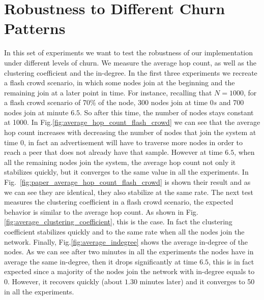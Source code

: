 \section{Robustness to Different Churn Patterns}
\label{sec:robustness}
In this set of experiments we want to test the robustness of our implementation under different levels of churn. We measure the average hop count, as well as the clustering coefficient and the in-degree. In the first three experiments we recreate a flash crowd scenario, in which some nodes join at the beginning and the remaining join at a later point in time. For instance, recalling that $N = 1000$, for a flash crowd scenario of 70\% of the node, 300 nodes join at time $0s$ and 700 nodes join at minute $6.5$. So after this time, the number of nodes stays constant at 1000. In Fig.\ref{fig:average_hop_count_flash_crowd} we can see that the average hop count increases with decreasing the number of nodes that join the system at time 0, in fact an advertisement will have to traverse more nodes in order to reach a peer that does not already have that sample. However at time $6.5$, when all the remaining nodes join the system, the average hop count not only it stabilizes quickly, but it converges to the same value in all the experiments. In Fig.~\ref{fig:paper_average_hop_count_flash_crowd} is shown their result and as we can see they are identical, they also stabilize at the same rate. The next test measures the clustering coefficient in a flash crowd scenario, the expected behavior is similar to the average hop count. As shown in Fig.\ref{fig:average_clustering_coefficient}, this is the case. In fact the clustering coefficient stabilizes quickly and to the same rate when all the nodes join the network. Finally, Fig.\ref{fig:average_indegree} shows the average in-degree of the nodes. As we can see after two minutes in all the experiments the nodes have in average the same in-degree, then it drops significantly at time $6.5$, this is in fact expected since a majority of the nodes join the network with in-degree equals to 0. However, it recovers quickly (about $1.30$ minutes later) and it converges to 50 in all the experiments.

